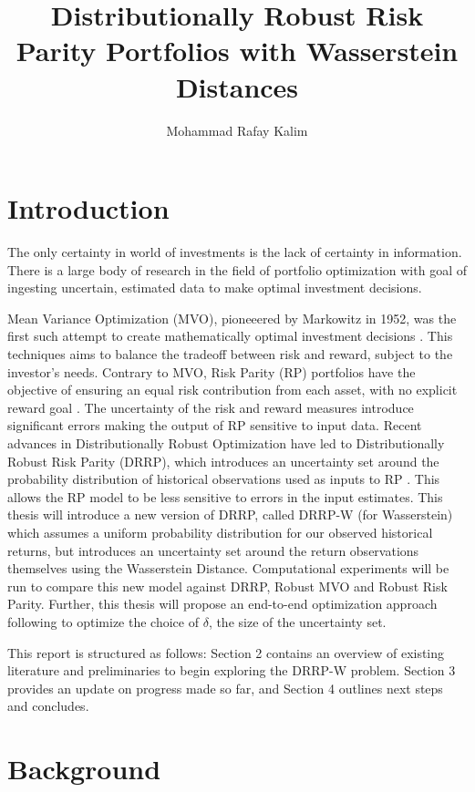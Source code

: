 \documentclass[12pt]{article}
\title{Distributionally Robust Risk Parity Portfolios with Wasserstein Distances}
\author{Mohammad Rafay Kalim }
\date{\vspace{-5ex}}
\begin{document}
\maketitle
\tableofcontents
\newpage
\section{Introduction}
The only certainty in world of investments is the lack of certainty in information. There is a large body of research in the field of portfolio optimization with goal of ingesting uncertain, estimated data to make optimal investment decisions. 


Mean Variance Optimization (MVO), pioneeered by Markowitz in 1952, was the first such attempt to create mathematically optimal investment decisions \cite{markowitz1952}. This techniques aims to balance the tradeoff between risk and reward, subject to the investor's needs. Contrary to MVO, Risk Parity (RP) portfolios have the objective of ensuring an equal risk contribution from each asset, with no explicit reward goal \cite{qian2011risk}.  The uncertainty of the risk and reward measures introduce significant errors making the output of RP sensitive to input data. Recent advances in Distributionally Robust Optimization have led to Distributionally Robust Risk Parity (DRRP), which introduces an uncertainty set around the probability distribution of historical observations used as inputs to RP \cite{costa2020robust}. This allows the RP model to be less sensitive to errors in the input estimates. This thesis will introduce a new version of DRRP, called DRRP-W (for Wasserstein) which assumes a uniform probability distribution for our observed historical returns, but introduces an uncertainty set around the return observations themselves using the Wasserstein Distance.  Computational experiments will be run to compare this new model against DRRP, Robust MVO and Robust Risk Parity. Further, this thesis will propose an end-to-end optimization approach following \cite{butler2023integrating} to optimize the choice of $\delta$, the size of the uncertainty set.

This report is structured as follows: Section 2 contains an overview of existing literature and preliminaries to begin exploring the DRRP-W problem. Section 3 provides an update on progress made so far, and Section 4 outlines next steps and concludes.
\newpage
\section{Background}
\end{document}
